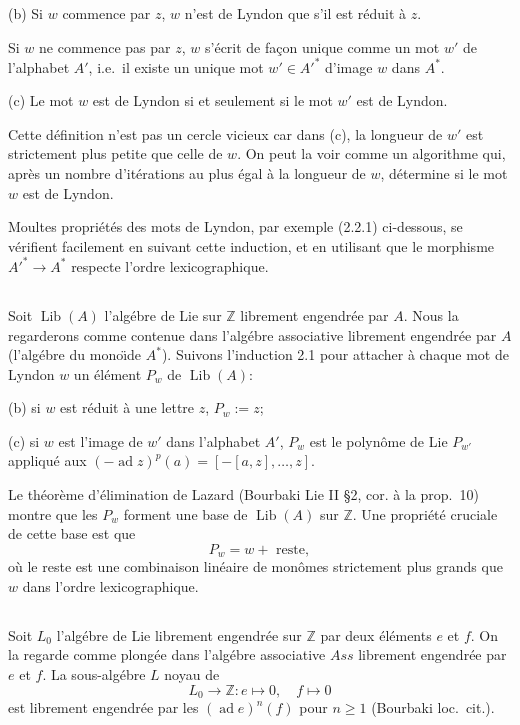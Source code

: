 \documentclass[11pt,a4paper]{article}
\theoremstyle{plain}
\theoremstyle{definition}
\DeclareMathOperator{\Lib}{Lib}
\DeclareMathOperator{\ad}{ad}
\newcommand{\Ass}{\textit{Ass}}
\newcommand{\Z}{\mathbb{Z}}
\begin{document}
(b) Si $w$ commence par $z$, $w$ n'est de Lyndon que s'il est r\'eduit \`a $z$.

Si $w$ ne commence pas par $z$, $w$ s'\'ecrit de fa\c con unique comme un mot $w'$ de l'alphabet $A'$, i.e.~il existe un unique mot $w' \in A'^{\ast}$ d'image $w$ dans $A^{\ast}$.

(c) Le mot $w$ est de Lyndon si et seulement si le mot $w'$ est de Lyndon.

Cette d\'efinition n'est pas un cercle vicieux car dans (c), la longueur de $w'$ est strictement plus petite que celle de $w$. On peut la voir comme un algorithme qui, apr\`es un nombre d'it\'erations au plus \'egal \`a la longueur de $w$, d\'etermine si le mot $w$ est de Lyndon.

Moultes propri\'et\'es des mots de Lyndon, par exemple (2.2.1) ci-dessous, se v\'erifient facilement en suivant cette induction, et en utilisant que le morphisme $A'^{\ast} \to A^{\ast}$ respecte l'ordre lexicographique.

\subsection{}
Soit $\Lib(A)$ l'alg\'ebre de Lie sur $\Z$ librement engendr\'ee par $A$. Nous la regarderons comme contenue dans l'alg\'ebre associative librement engendr\'ee par $A$ (l'alg\'ebre du mono\"{\i}de $A^{\ast}$). Suivons l'induction 2.1 pour attacher \`a chaque mot de Lyndon $w$ un \'el\'ement $P_w$ de $\Lib(A)$:

(b) si $w$ est r\'eduit \`a une lettre $z$, $P_w := z$;

(c) si $w$ est l'image de $w'$ dans l'alphabet $A'$, $P_w$ est le polyn\^ome de Lie $P_{w'}$ appliqu\'e aux $(-\ad z)^p(a) = [-[a,z],\ldots,z]$.

Le th\'eor\`eme d'\'elimination de Lazard (Bourbaki Lie II \S 2, cor. \`a la prop.~10) montre que les $P_w$ forment une base de $\Lib(A)$ sur $\Z$. Une propri\'et\'e cruciale de cette base est que
\begin{equation}\label{eq:2.2.1}
P_w = w + \text{ reste},
\end{equation}
o\`u le reste est une combinaison lin\'eaire de mon\^omes strictement plus grands que $w$ dans l'ordre lexicographique.

\subsection{}
Soit $L_0$ l'alg\'ebre de Lie librement engendr\'ee sur $\Z$ par deux \'el\'ements $e$ et $f$. On la regarde comme plong\'ee dans l'alg\'ebre associative $\Ass$ librement engendr\'ee par $e$ et $f$. La sous-alg\'ebre $L$ noyau de
\begin{equation}\label{eq:2.3.1}
L_0 \to \Z: e \mapsto 0, \quad f \mapsto 0
\end{equation}
est librement engendr\'ee par les $(\ad e)^n(f)$ pour $n \geq 1$ (Bourbaki loc.~cit.).
\end{document}
